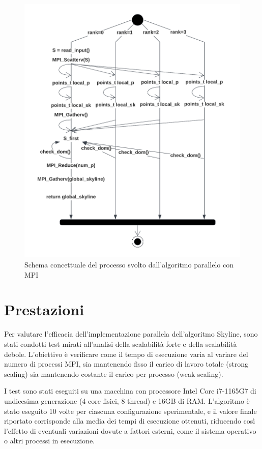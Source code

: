 \documentclass[letterpaper,11pt,leqno]{article}
\begin{document}
\begin{figure}[h]
    \centering
    \includegraphics[scale=0.3]{MPI.pdf}
    \caption{Schema concettuale del processo svolto dall'algoritmo parallelo con MPI}
    \label{f:graph2}
\end{figure}




\section{Prestazioni}

Per valutare l'efficacia dell'implementazione parallela dell'algoritmo Skyline, sono stati condotti test mirati all'analisi della scalabilità forte e della scalabilità debole. L'obiettivo è verificare come il tempo di esecuzione varia al variare del numero di processi MPI, sia mantenendo fisso il carico di lavoro totale (strong scaling) sia mantenendo costante il carico per processo (weak scaling).  

I test sono stati eseguiti su una macchina con processore Intel Core i7-1165G7 di undicesima generazione (4 core fisici, 8 thread) e 16GB di RAM. L'algoritmo è stato eseguito 10 volte per ciascuna configurazione sperimentale, e il valore finale riportato corrisponde alla media dei tempi di esecuzione ottenuti, riducendo così l'effetto di eventuali variazioni dovute a fattori esterni, come il sistema operativo o altri processi in esecuzione.  
\end{document}
